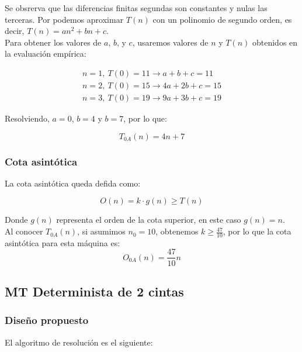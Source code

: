Se obsrerva que las diferencias finitas segundas son constantes y nulas las terceras. Por podemos aproximar $T(n)$ con un polinomio de segundo orden, es decir, $T(n) = an^2 + bn + c$.\\

Para obtener los valores de $a$, $b$, y $c$, usaremos valores de $n$ y $T(n)$ obtenidos en la evaluación empírica:

\begin{subequations}
    \begin{gather}
        n = 1,\ T(0) = 11 \rightarrow a + b + c = 11 \\
        n = 2,\ T(0) = 15 \rightarrow 4a + 2b + c = 15 \\
        n = 3,\ T(0) = 19 \rightarrow 9a + 3b + c = 19
    \end{gather}
\end{subequations}

Resolviendo, $a=0$, $b=4$ y $b=7$, por lo que:

\begin{equation}
    T_{0A}(n) = 4n + 7
\end{equation}

\subsubsection*{Cota asintótica}
La cota asintótica queda defida como:

\begin{equation}
    O(n) = k \cdot g(n) \geq T(n)
    \label{eq:On}
\end{equation}

Donde $g(n)$ representa el orden de la cota superior, en este caso $g(n) = n$.\\

Al conocer $T_{0A}(n)$, si asumimos $n_0 = 10$, obtenemos $k \geq \frac{47}{10}$, por lo que la cota asintótica para esta máquina es:
\begin{equation}
    O_{0A}(n) = \frac{47}{10} n
\end{equation}



\subsection{MT Determinista de 2 cintas}

\subsubsection*{Diseño propuesto}
El algoritmo de resolución es el siguiente:



